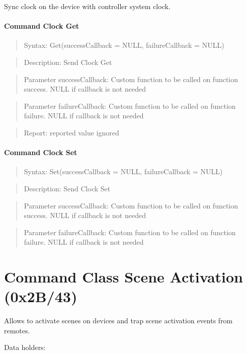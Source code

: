 Sync clock on the device with controller system clock.
\paragraph{Command Clock Get}
\begin{quote}Syntax: Get(successCallback = NULL, failureCallback = NULL)\end{quote}
\begin{quote}Description: Send Clock Get\end{quote}
\begin{quote}Parameter successCallback: Custom function to be called on function success. NULL if callback is not needed\end{quote}
\begin{quote}Parameter failureCallback: Custom function to be called on function failure. NULL if callback is not needed\end{quote}
\begin{quote}Report: reported value ignored\end{quote}

\paragraph{Command Clock Set}
\begin{quote}Syntax: Set(successCallback = NULL, failureCallback = NULL)\end{quote}
\begin{quote}Description: Send Clock Set\end{quote}
\begin{quote}Parameter successCallback: Custom function to be called on function success. NULL if callback is not needed\end{quote}
\begin{quote}Parameter failureCallback: Custom function to be called on function failure. NULL if callback is not needed\end{quote}



\section{Command Class Scene Activation (0x2B/43)}

Allows to activate scenes on devices and trap scene activation events from remotes.
\newline

\noindent
Data holders:

